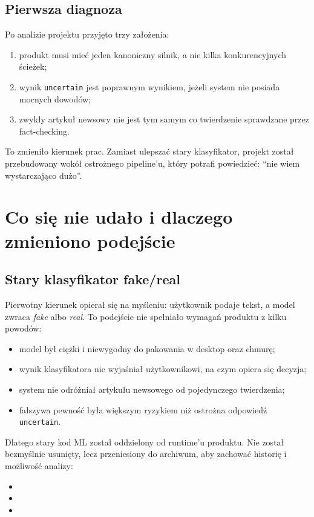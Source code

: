 \documentclass[12pt,a4paper]{article}
\begin{document}
\subsection{Pierwsza diagnoza}
Po analizie projektu przyjęto trzy założenia:
\begin{enumerate}
  \item produkt musi mieć jeden kanoniczny silnik, a nie kilka konkurencyjnych ścieżek;
  \item wynik \texttt{uncertain} jest poprawnym wynikiem, jeżeli system nie posiada mocnych dowodów;
  \item zwykły artykuł newsowy nie jest tym samym co twierdzenie sprawdzane przez fact-checking.
\end{enumerate}

To zmieniło kierunek prac.
Zamiast ulepszać stary klasyfikator, projekt został przebudowany wokół ostrożnego pipeline'u, który potrafi powiedzieć: ``nie wiem wystarczająco dużo''.

\section{Co się nie udało i dlaczego zmieniono podejście}
\subsection{Stary klasyfikator fake/real}
Pierwotny kierunek opierał się na myśleniu: użytkownik podaje tekst, a model zwraca \textit{fake} albo \textit{real}.
To podejście nie spełniało wymagań produktu z kilku powodów:
\begin{itemize}
  \item model był ciężki i niewygodny do pakowania w desktop oraz chmurę;
  \item wynik klasyfikatora nie wyjaśniał użytkownikowi, na czym opiera się decyzja;
  \item system nie odróżniał artykułu newsowego od pojedynczego twierdzenia;
  \item fałszywa pewność była większym ryzykiem niż ostrożna odpowiedź \texttt{uncertain}.
\end{itemize}

Dlatego stary kod ML został oddzielony od runtime'u produktu.
Nie został bezmyślnie usunięty, lecz przeniesiony do archiwum, aby zachować historię i możliwość analizy:
\begin{itemize}
  \item {}
  \item {}
  \item {}
\end{itemize}
\end{document}
